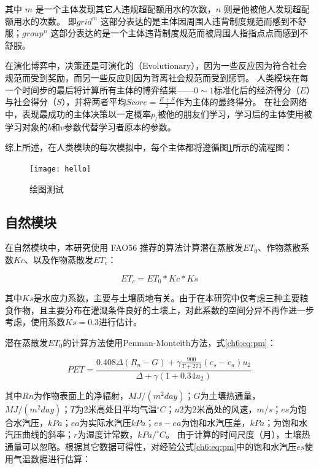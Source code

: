 其中 $m$ 是一个主体发现其它人违规超配额用水的次数，$n$ 则是他被他人发现超配额用水的次数。
即$grid^m$ 这部分表达的是主体因周围人违背制度规范而感到不舒服；$group^n$ 这部分表达的是一个主体违背制度规范而被周围人指指点点而感到不舒服。

在演化博弈中，决策还是可演化的（Evolutionary），因为一些反应因为符合社会规范而受到奖励，而另一些反应则因为背离社会规范而受到惩罚。
人类模块在每一个时间步的最后将计算所有主体的博弈结果——$0 \sim 1$标准化后的经济得分（$E$）与社会得分（$S$），并将两者平均$Score = \frac{E + S}{2}$作为主体的最终得分。
在社会网络中，表现最成功的主体决策以一定概率$p_{l}$被他的朋友们学习，学习后的主体使用被学习对象的$b$和$v$参数代替学习者原本的参数。

综上所述，在人类模块的每次模拟中，每个主体都将遵循图\ref{ch6:fig:society}所示的流程图：

\begin{figure}[htb]
    \centering
    \texttt{[image: hello]}
    \caption{绘图测试}\label{ch6:fig:society}
\end{figure}

\subsection{自然模块}

在自然模块中，本研究使用 FAO56 推荐的算法计算潜在蒸散发$ET_0$、作物蒸散系数$Kc$、以及作物蒸散发$ET_c$：

\begin{equation}
    ET_c = ET_0 * Kc * Ks
\end{equation}

其中$Ks$是水应力系数，主要与土壤质地有关。由于在本研究中仅考虑三种主要粮食作物，且主要分布在灌溉条件良好的土壤上，对此系数的空间分异不再作进一步考虑，使用系数$Ks = 0.3$进行估计。  %

潜在蒸散发$ET_0$的计算方法使用Penman-Monteith方法，式\ref{ch6:eq:pm}：

\begin{equation}
    \label{ch6:eq:pm}
    PET = \frac{0.408 \Delta (R_{n}-G)+\gamma \frac{900}{T+273}
    (e_s-e_a) u_2}{\Delta+\gamma(1+0.34 u_2)}
\end{equation}

其中$Rn$为作物表面上的净辐射，$MJ/(m^2 day)$；$G$为土壤热通量，$MJ/(m^2 day)$；$T$为$2$米高处日平均气温$^\circ C$；$u2$为$2$米高处的风速，$m/s$；$es$为饱合水汽压，$kPa$；$ea$为实际水汽压$kPa$；$es - ea$为饱和水汽压差，$kPa$；为饱和水汽压曲线的斜率；$r$为湿度计常数，$kPa/^\circ C$。
由于计算的时间尺度（月），土壤热通量可以忽略。根据其它数据可得性，对经验公式\ref{ch6:eq:pm}中的饱和水汽压$es$使用气温数据进行估算：

